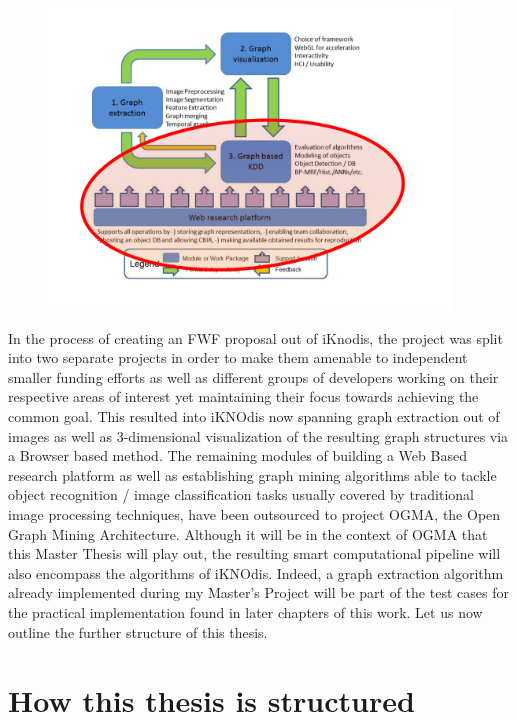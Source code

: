 \par

\begin{figure}
\includegraphics[width=0.95\textwidth]{figures/iKNOdis_OGMA_structure}
\end{figure}


In the process of creating an FWF proposal out of iKnodis, the project was split into two separate projects in order to make them amenable to independent smaller funding efforts as well as different groups of developers working on their respective areas of interest yet maintaining their focus towards achieving the common goal. This resulted into iKNOdis now spanning graph extraction out of images as well as 3-dimensional visualization of the resulting graph structures via a Browser based method. The remaining modules of building a Web Based research platform as well as establishing graph mining algorithms able to tackle object recognition / image classification tasks usually covered by traditional image processing techniques, have been outsourced to project OGMA, the Open Graph Mining Architecture. Although it will be in the context of OGMA that this Master Thesis will play out, the resulting smart computational pipeline will also encompass the algorithms of iKNOdis. Indeed, a graph extraction algorithm already implemented during my Master's Project \cite{GraphExtractPaper} will be part of the test cases for the practical implementation found in later chapters of this work. Let us now outline the further structure of this thesis.


\section{How this thesis is structured}
\label{section:thesis_structure}

